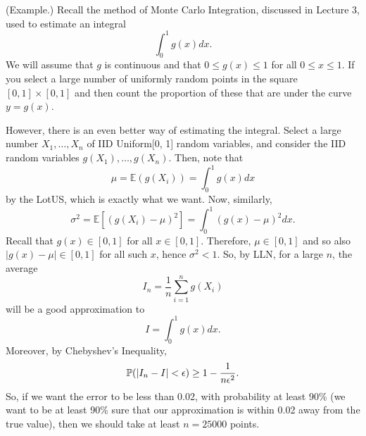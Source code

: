 \begin{mdframed}[]
    (Example.) Recall the method of Monte Carlo Integration, discussed in Lecture 3, used to estimate an integral \[\int_0^1 g(x) dx.\] We will assume that $g$ is continuous and that $0 \leq g(x) \leq 1$ for all $0 \leq x \leq 1$. If you select a large number of uniformly random points in the square $[0, 1] \times [0, 1]$ and then count the proportion of these that are under the curve $y = g(x)$. 

    \bigskip 

    However, there is an even better way of estimating the integral. Select a large number $X_1, \dots, X_n$ of IID Uniform[0, 1] random variables, and consider the IID random variables $g(X_1), \dots, g(X_n)$. Then, note that 
    \[\mu = \mathbb{E}(g(X_i)) = \int_0^1 g(x) dx\]
    by the LotUS, which is exactly what we want. Now, similarly,
    \[\sigma^2 = \mathbb{E}[(g(X_i) - \mu)^2] = \int_{0}^1 (g(x) - \mu)^2 dx.\]
    Recall that $g(x) \in [0, 1]$ for all $x \in [0, 1]$. Therefore, $\mu \in [0, 1]$ and so also $|g(x) - \mu| \in [0, 1]$ for all such $x$, hence $\sigma^2 < 1$. So, by LLN, for a large $n$, the average \[I_n = \frac{1}{n} \sum_{i = 1}^{n} g(X_i)\] will be a good approximation to \[I = \int_0^1 g(x) dx.\] Moreover, by Chebyshev's Inequality, \[\mathbb{P}(|I_n - I| < \epsilon) \geq 1 - \frac{1}{n\epsilon^2}.\] So, if we want the error to be less than 0.02, with probability at least 90\% (we want to be at least 90\% sure that our approximation is within 0.02 away from the true value), then we should take at least $n = 25000$ points. 
\end{mdframed}